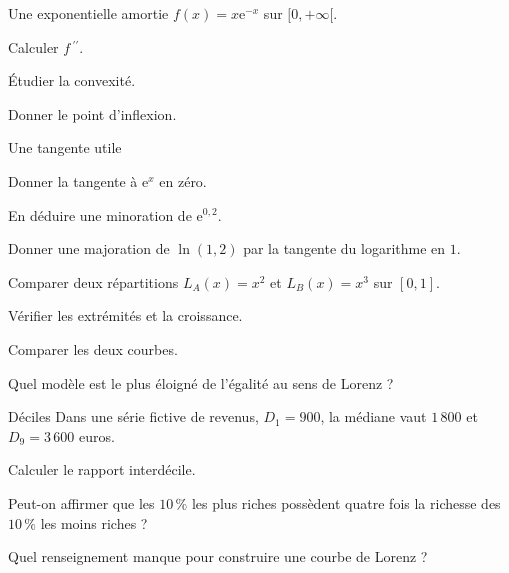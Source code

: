 \begingroup\renewcommand{\otBesoinPlace}[1]{}\begin{minipage}{\linewidth}
\begin{exercice}[2]{Une exponentielle amortie}
$f(x)=x\mathrm e^{-x}$ sur $[0,+\infty[$.
\begin{questions}
\item Calculer $f\,\!^{\prime\prime}$.
\item Étudier la convexité.
\item Donner le point d’inflexion.
\end{questions}
\end{exercice}
\begin{exercice}[2]{Une tangente utile}

\begin{questions}
\item Donner la tangente à $\mathrm e^x$ en zéro.
\item En déduire une minoration de $\mathrm e^{0{,}2}$.
\item Donner une majoration de $\ln(1{,}2)$ par la tangente du logarithme en $1$.
\end{questions}
\end{exercice}
\begin{exercice}[2]{Comparer deux répartitions}
$L_A(x)=x^2$ et $L_B(x)=x^3$ sur $[0,1]$.
\begin{questions}
\item Vérifier les extrémités et la croissance.
\item Comparer les deux courbes.
\item Quel modèle est le plus éloigné de l’égalité au sens de Lorenz ?
\end{questions}
\end{exercice}
\begin{exercice}[2]{Déciles}
Dans une série fictive de revenus, $D_1=900$, la médiane vaut $1\,800$ et $D_9=3\,600$ euros.
\begin{questions}
\item Calculer le rapport interdécile.
\item Peut-on affirmer que les $10\,\%$ les plus riches possèdent quatre fois la richesse des $10\,\%$ les moins riches ?
\item Quel renseignement manque pour construire une courbe de Lorenz ?
\end{questions}
\end{exercice}
\end{minipage}\endgroup
\clearpage
{}
